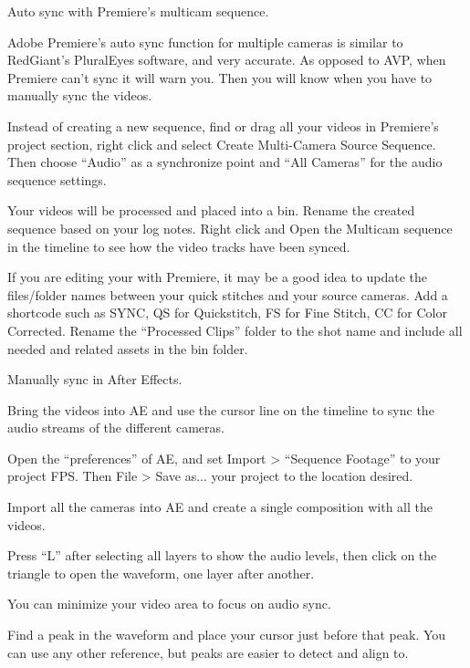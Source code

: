 \begin{fullwidth}
{\large Auto sync with Premiere’s multicam sequence. \par}

Adobe Premiere’s auto sync function for multiple cameras is similar to RedGiant’s PluralEyes software, and very accurate. As opposed to AVP, when Premiere can’t sync it will warn you. Then you will know when you have to manually sync the videos.

\clearpage
Instead of creating a new sequence, find or drag all your videos in Premiere’s project section, right click and select Create Multi-Camera Source Sequence. Then choose “Audio” as a synchronize point and “All Cameras” for the audio sequence settings.



Your videos will be processed and placed into a bin. Rename the created sequence based on your log notes. Right click and Open the Multicam sequence in the timeline to see how the video tracks have been synced.


If you are editing your \textbf{} with Premiere, it may be a good idea to update the files/folder names between your quick stitches and your source cameras. Add a shortcode such as SYNC, QS for Quickstitch, FS for Fine Stitch, CC for Color Corrected. Rename the “Processed Clips” folder to the shot name and include all needed and related assets in the bin folder.

\clearpage
{\large Manually sync in After Effects. \par}

Bring the videos into AE and use the cursor line on the timeline to sync the audio streams of the different cameras.

Open the “preferences” of AE, and set Import > “Sequence Footage” to your project FPS. Then File > Save as... your project to the location desired.

Import all the cameras into AE and create a single composition with all the videos.

Press “L” after selecting all layers to show the audio levels, then click on the triangle to open the waveform, one layer after another. 


You can minimize your video area to focus on audio sync.

Find a peak in the waveform and place your cursor just before that peak. You can use any other reference, but peaks are easier to detect and align to.


\end{fullwidth}

